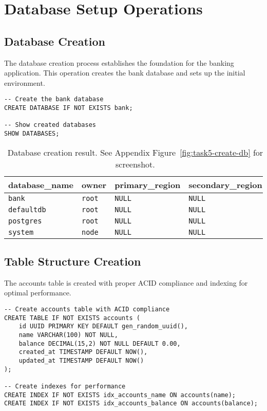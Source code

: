 \section{Database Setup Operations}

\subsection{Database Creation}
The database creation process establishes the foundation for the banking application. This operation creates the bank database and sets up the initial environment.

\begin{verbatim}
-- Create the bank database
CREATE DATABASE IF NOT EXISTS bank;

-- Show created databases
SHOW DATABASES;
\end{verbatim}

\begin{table}[H]
  \centering
  \begin{tabular}{|l|l|l|l|}
    \hline
    \textbf{database\_name} & \textbf{owner} & \textbf{primary\_region} & \textbf{secondary\_region} \\
    \hline
    \texttt{bank} & \texttt{root} & \texttt{NULL} & \texttt{NULL} \\
    \texttt{defaultdb} & \texttt{root} & \texttt{NULL} & \texttt{NULL} \\
    \texttt{postgres} & \texttt{root} & \texttt{NULL} & \texttt{NULL} \\
    \texttt{system} & \texttt{node} & \texttt{NULL} & \texttt{NULL} \\
    \hline
  \end{tabular}
  \caption{Database creation result. See Appendix Figure~\ref{fig:task5-create-db} for screenshot.}
\end{table}

\subsection{Table Structure Creation}
The accounts table is created with proper ACID compliance and indexing for optimal performance.

\begin{verbatim}
-- Create accounts table with ACID compliance
CREATE TABLE IF NOT EXISTS accounts (
    id UUID PRIMARY KEY DEFAULT gen_random_uuid(),
    name VARCHAR(100) NOT NULL,
    balance DECIMAL(15,2) NOT NULL DEFAULT 0.00,
    created_at TIMESTAMP DEFAULT NOW(),
    updated_at TIMESTAMP DEFAULT NOW()
);

-- Create indexes for performance
CREATE INDEX IF NOT EXISTS idx_accounts_name ON accounts(name);
CREATE INDEX IF NOT EXISTS idx_accounts_balance ON accounts(balance);
\end{verbatim}

